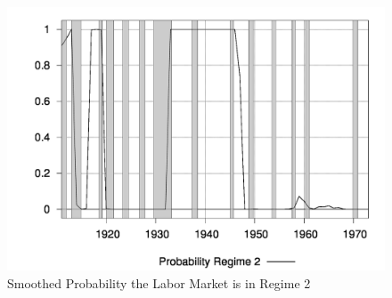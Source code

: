 \documentclass[12pt]{article}
\begin{document}
\begin{figure}
\begin{center}
\begin{tabular}{c}
\end{tabular}
\end{center}
\end{figure}

\begin{figure}\caption{Smoothed Probability the Labor Market is in Regime 2}\label{fg:regimes}
\begin{center}
\includegraphics[scale=0.18]{regime.png} 
\end{center}
\end{figure}
\end{document}
